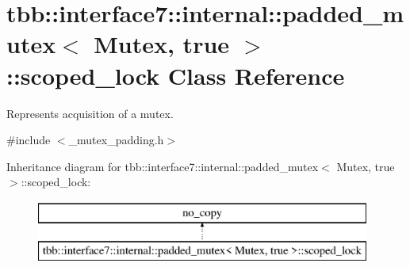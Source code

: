 \hypertarget{classtbb_1_1interface7_1_1internal_1_1padded__mutex_3_01Mutex_00_01true_01_4_1_1scoped__lock}{}\section{tbb\+:\+:interface7\+:\+:internal\+:\+:padded\+\_\+mutex$<$ Mutex, true $>$\+:\+:scoped\+\_\+lock Class Reference}
\label{classtbb_1_1interface7_1_1internal_1_1padded__mutex_3_01Mutex_00_01true_01_4_1_1scoped__lock}


Represents acquisition of a mutex.  




{\ttfamily \#include $<$\+\_\+mutex\+\_\+padding.\+h$>$}

Inheritance diagram for tbb\+:\+:interface7\+:\+:internal\+:\+:padded\+\_\+mutex$<$ Mutex, true $>$\+:\+:scoped\+\_\+lock\+:\begin{figure}[H]
\begin{center}
\leavevmode
\includegraphics[height=2.000000cm]{classtbb_1_1interface7_1_1internal_1_1padded__mutex_3_01Mutex_00_01true_01_4_1_1scoped__lock}
\end{center}
\end{figure}
